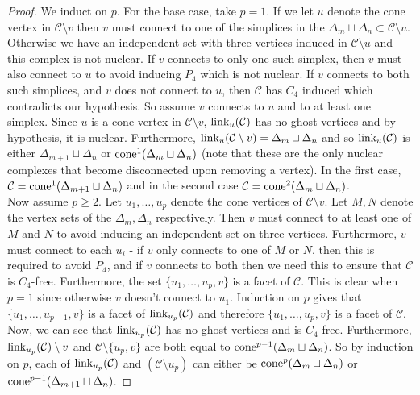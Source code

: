 \documentclass[letterpaper,12pt]{amsart}
\theoremstyle{plain}
\theoremstyle{definition}
\theoremstyle{remark}
\newcommand{\calc}{\mathcal{C}}
\newcommand{\link}{\textnormal{link}}
\newcommand{\cone}{\textnormal{cone}}
\begin{document}
\begin{proof}
	We induct on $p$.
	For the base case, take $p = 1$.
	If we let $u$ denote the cone vertex in $\mathcal{C}\setminus v$
	then $v$ must connect to one of the simplices in the $\Delta_m\sqcup \Delta_n \subset \mathcal{C}\setminus u$.
	Otherwise we have an independent set with three vertices induced in $\mathcal{C}\setminus u$ and this complex is not nuclear.
	If $v$ connects to only one such simplex, then $v$ must also connect to $u$ to avoid inducing $P_4$ which is not nuclear.
	If $v$ connects to both such simplices, and $v$ does not connect to $u$, then $\mathcal{C}$
	has $C_4$ induced which contradicts our hypothesis.
	{ So assume $v$ connects to $u$ and to at least one simplex.}
	Since $u$ is a cone vertex in $\mathcal{C}\setminus v$, $\link_u(\mathcal{C})$ has no ghost vertices and by hypothesis, it is nuclear.
	Furthermore, $\link_u(\mathcal{C}\setminus v) = \Delta_{m}\sqcup \Delta_n$
	and so $\link_u(\mathcal{C})$ is either $\Delta_{m+1}\sqcup \Delta_n$
	or $\cone^1(\Delta_{m}\sqcup\Delta_{n})$
	(note that these are the only nuclear complexes that become disconnected upon removing a vertex).
	In the first case, $\mathcal{C}= \cone^1(\Delta_{m+1}\sqcup \Delta_n)$
	and in the second case $\mathcal{C}=\cone^2(\Delta_{m}\sqcup\Delta_{n})$.
	\\
	\indent
	Now assume $p \ge 2$.
	Let $u_1,\dots,u_p$ denote the cone vertices of $\mathcal{C}\setminus v$.
	Let $M,N$ denote the vertex sets of the $\Delta_m,\Delta_n$ respectively.
	Then $v$ must connect to at least one of $M$ and $N$ to avoid inducing an independent set on three vertices.
	Furthermore, $v$ must connect to each $u_i$ -
	if $v$ only connects to one of $M$ or $N$, then this is required to avoid $P_4$,
	and if $v$ connects to both then
	we need this to ensure that $\mathcal{C}$ is $C_4$-free.
	Furthermore, the set $\{u_1,\dots,u_p,v\}$ is a facet of $\mathcal{C}$.
	This is clear when $p = 1$ since otherwise $v$ doesn't connect to $u_1$.
	Induction on $p$ gives that $\{u_1,\dots,u_{p-1},v\}$ is a facet of $\link_{u_p}(\mathcal{C})$
	and therefore $\{u_1,\dots,u_p,v\}$ is  a facet of $\mathcal{C}$.
	\\
	\indent
	Now, we can see that $\link_{u_p}(\mathcal{C})$ has no ghost vertices and is $C_4$-free.
	Furthermore, $\link_{u_p}(\mathcal{C})\setminus v$ and $\calc \setminus \{u_p, v\}$
	are both equal to $\cone^{p-1}(\Delta_m \sqcup \Delta_n)$.
	So by induction on $p$, each of $\link_{u_p}(\mathcal{C})$ and $(\mathcal{C}\setminus u_p)$
	can either be $\cone^p(\Delta_m \sqcup \Delta_n)$ or $\cone^{p-1}(\Delta_{m+1}\sqcup \Delta_n)$.

\end{proof}
\end{document}
